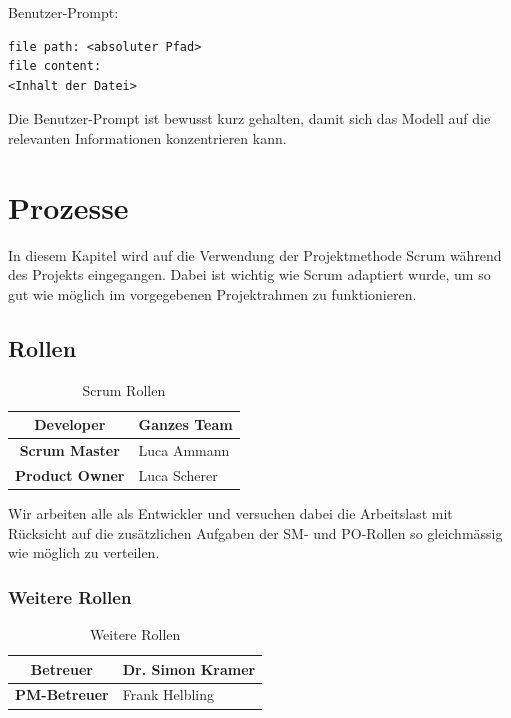 \documentclass[a4paper,12pt]{report}
\begin{document}
    Benutzer-Prompt:
    \begin{lstlisting}[label={lst:user-prompt}]
file path: <absoluter Pfad>
file content:
<Inhalt der Datei>
    \end{lstlisting}
    Die Benutzer-Prompt ist bewusst kurz gehalten, damit sich das Modell auf die relevanten Informationen konzentrieren kann.

    \clearpage


    \section{Prozesse}\label{sec:prozesse}
    In diesem Kapitel wird auf die Verwendung der Projektmethode Scrum während des Projekts eingegangen.
    Dabei ist wichtig wie Scrum adaptiert wurde, um so gut wie möglich im vorgegebenen Projektrahmen zu funktionieren.

    \subsection{Rollen}
    \begin{table}[h!]
        \centering
        \setlength{\leftmargini}{0.8cm}
        \begin{tabular}{|c|p{10cm}|}
            \hline
            \textbf{Developer}     & Ganzes Team  \\ \hline
            \textbf{Scrum Master}  & Luca Ammann  \\ \hline
            \textbf{Product Owner} & Luca Scherer \\ \hline
        \end{tabular}
        \caption{Scrum Rollen}\label{tab:scrum-roles}
    \end{table}
    Wir arbeiten alle als Entwickler und versuchen dabei die Arbeitslast mit Rücksicht auf die
    zusätzlichen Aufgaben der SM- und PO-Rollen so gleichmässig wie möglich zu verteilen.

    \subsubsection*{Weitere Rollen}
    \begin{table}[h!]
        \centering
        \setlength{\leftmargini}{0.8cm}
        \begin{tabular}{|c|p{10cm}|}
            \hline
            \textbf{Betreuer}    & Dr. Simon Kramer \\ \hline
            \textbf{PM-Betreuer} & Frank Helbling   \\ \hline
        \end{tabular}
        \caption{Weitere Rollen}\label{tab:additional-roles}
    \end{table}
\end{document}
